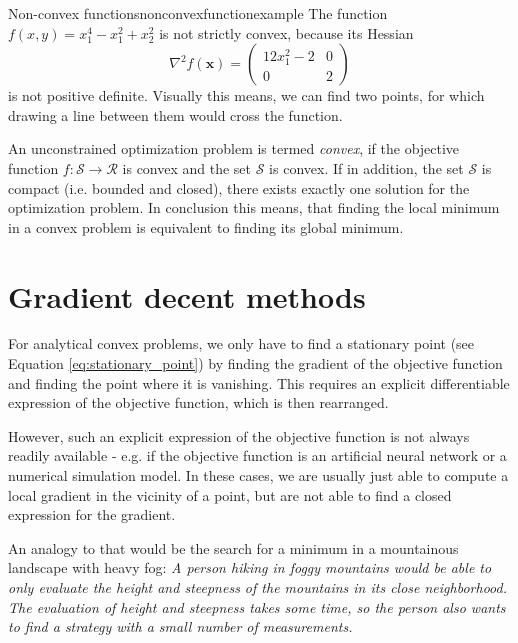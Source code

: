 \begin{example}{Non-convex functions}{nonconvexfunctionexample}
    The function $f(x, y)=x_1^4-x_1^2+x_2^2$ is not strictly convex, because its Hessian 
    \begin{equation}
        \nabla^2f(\mathbf{x}) = 
        \begin{pmatrix}
        12x_1^2-2 & 0 \\ 
        0       & 2         
        \end{pmatrix}
    \end{equation} 
    is not positive definite. Visually this means, we can find two points, for which drawing a line between them would cross the function. 
    
    
\end{example}

An unconstrained optimization problem is termed \emph{convex}, if the objective function $f: \mathcal{S} \rightarrow \mathcal{R}$ is convex and the set $\mathcal{S}$ is convex. If in addition, the set $\mathcal{S}$ is compact (i.e. bounded and closed), there exists exactly one solution for the optimization problem. In conclusion this means, that finding the local minimum in a convex problem is equivalent to finding its global minimum. 

\section{Gradient decent methods}
For analytical convex problems, we only have to find a stationary point (see Equation \ref{eq:stationary_point}) by finding the gradient of the objective function and finding the point where it is vanishing. This requires an explicit differentiable expression of the objective function, which is then rearranged.

However, such an explicit expression of the objective function is not always readily available - e.g. if the objective function is an artificial neural network or a numerical simulation model. In these cases, we are usually just able to compute a local gradient in the vicinity of a point, but are not able to find a closed expression for the gradient. 

An analogy to that would be the search for a minimum in a mountainous landscape with heavy fog: \emph{A person hiking in foggy mountains would be able to only evaluate the height and steepness of the mountains in its close neighborhood. The evaluation of height and steepness takes some time, so the person also wants to find a strategy with a small number of measurements.}

